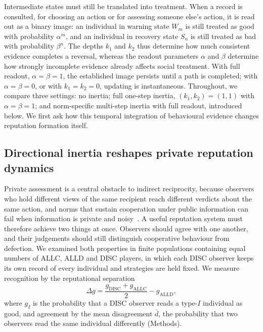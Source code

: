 \documentclass[fleqn,10pt]{article}
\begin{document}
Intermediate states must still be translated into treatment. When a record is consulted, for choosing an action or for assessing someone else's action, it is read out as a binary image: an individual in warning state $W_m$ is still treated as good with probability $\alpha^m$, and an individual in recovery state $S_n$ is still treated as bad with probability $\beta^n$. The depths $k_1$ and $k_2$ thus determine how much consistent evidence completes a reversal, whereas the readout parameters $\alpha$ and $\beta$ determine how strongly incomplete evidence already affects social treatment. With full readout, $\alpha=\beta=1$, the established image persists until a path is completed; with $\alpha=\beta=0$, or with $k_1=k_2=0$, updating is instantaneous. Throughout, we compare three settings: no inertia; full one-step inertia, $(k_1,k_2)=(1,1)$ with $\alpha=\beta=1$; and norm-specific multi-step inertia with full readout, introduced below. We first ask how this temporal integration of behavioural evidence changes reputation formation itself.

\subsection*{Directional inertia reshapes private reputation dynamics}

Private assessment is a central obstacle to indirect reciprocity, because observers who hold different views of the same recipient reach different verdicts about the same action, and norms that sustain cooperation under public information can fail when information is private and noisy~\cite{hilbe2018}. A useful reputation system must therefore achieve two things at once. Observers should agree with one another, and their judgements should still distinguish cooperative behaviour from defection. We examined both properties in finite populations containing equal numbers of ALLC, ALLD and DISC players, in which each DISC observer keeps its own record of every individual and strategies are held fixed. We measure recognition by the reputational separation
\begin{equation}
\Delta g=\frac{g_{\mathrm{DISC}}+g_{\mathrm{ALLC}}}{2}-g_{\mathrm{ALLD}},
\label{eq:results-separation}
\end{equation}
where $g_I$ is the probability that a DISC observer reads a type-$I$ individual as good, and agreement by the mean disagreement $\bar d$, the probability that two observers read the same individual differently (Methods).
\end{document}

